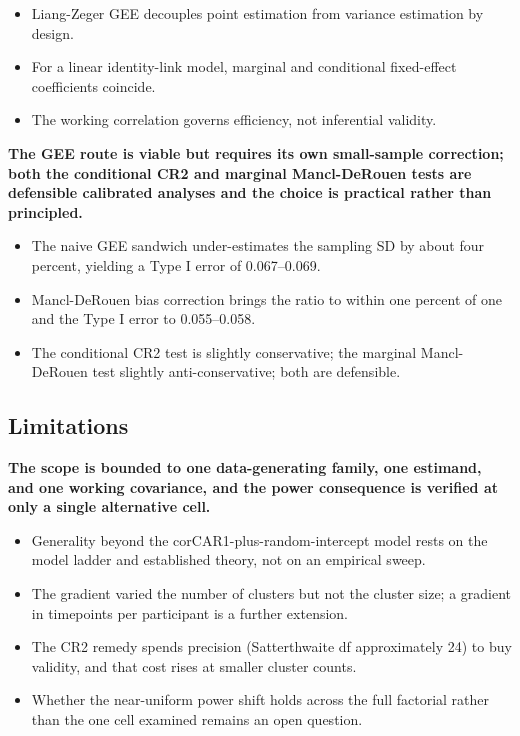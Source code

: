 \documentclass[
  11pt,
]{article}
\begin{document}
\begin{itemize}\setlength{\itemsep}{2pt}\setlength{\parskip}{0pt}
\item Liang-Zeger GEE decouples point estimation from variance estimation by design.
\item For a linear identity-link model, marginal and conditional fixed-effect coefficients coincide.
\item The working correlation governs efficiency, not inferential validity.
\end{itemize}

\textbf{The GEE route is viable but requires its own small-sample correction; both the conditional CR2 and marginal Mancl-DeRouen tests are defensible calibrated analyses and the choice is practical rather than principled.}

\begin{itemize}\setlength{\itemsep}{2pt}\setlength{\parskip}{0pt}
\item The naive GEE sandwich under-estimates the sampling SD by about four percent, yielding a Type I error of 0.067--0.069.
\item Mancl-DeRouen bias correction brings the ratio to within one percent of one and the Type I error to 0.055--0.058.
\item The conditional CR2 test is slightly conservative; the marginal Mancl-DeRouen test slightly anti-conservative; both are defensible.
\end{itemize}

\subsection{Limitations}\label{limitations}

\textbf{The scope is bounded to one data-generating family, one estimand, and one working covariance, and the power consequence is verified at only a single alternative cell.}

\begin{itemize}\setlength{\itemsep}{2pt}\setlength{\parskip}{0pt}
\item Generality beyond the corCAR1-plus-random-intercept model rests on the model ladder and established theory, not on an empirical sweep.
\item The gradient varied the number of clusters but not the cluster size; a gradient in timepoints per participant is a further extension.
\item The CR2 remedy spends precision (Satterthwaite df approximately 24) to buy validity, and that cost rises at smaller cluster counts.
\item Whether the near-uniform power shift holds across the full factorial rather than the one cell examined remains an open question.
\end{itemize}
\end{document}
